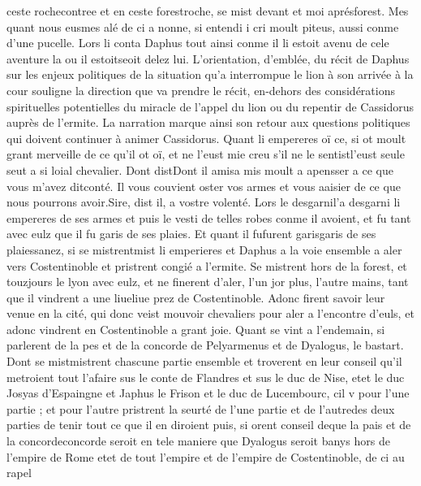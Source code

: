 \documentclass{article}
\begin{document}
\begin{pages}
      ceste 
         rochecontree et en ceste forestroche, se mist devant et 
            moi aprésforest. Mes quant nous eusmes alé de ci a nonne, 
      si entendi i cri moult piteus, aussi conme d’une pucelle.
   Lors li conta Daphus tout ainsi conme il li estoit avenu 
      de cele aventure la ou il estoitseoit delez lui.
L'orientation, d'emblée, du récit de Daphus sur les enjeux politiques de la situation qu'a interrompue le lion
à son arrivée à la cour souligne la direction que va prendre le récit, en-dehors des considérations spirituelles potentielles 
du miracle de l'appel du lion ou du repentir de Cassidorus auprès de l'ermite. La narration marque ainsi son retour aux questions
politiques qui doivent continuer à animer Cassidorus. \pend
\pstart Quant li empereres oï ce, si ot moult grant merveille de ce qu’il ot
   oï, et ne l’eust mie creu s’il ne le sentistl'eust seule seut 
   a si loial chevalier.
   Dont distDont
      il
      amisa mis moult a apensser a ce que vous m’avez 
      ditconté. Il vous couvient oster vos armes 
      et vous aaisier de ce que nous pourrons avoir.Sire, dist il, a vostre volenté.
   Lors le desgarnil'a desgarni li empereres 
   de ses armes et puis le vesti de telles robes conme il avoient, et fu tant avec eulz que il fu garis de ses plaies. Et quant il 
   fufurent 
   garisgaris de ses plaiessanez, 
   si se mistrentmist li emperieres 
   et Daphus a la voie ensemble a aler vers 
   Costentinoble et pristrent congié a l’ermite. 
   Se mistrent hors de la forest, et touzjours 
   le lyon avec eulz, et ne finerent d’aler, l’un jor plus, l’autre mains, 
   tant que il vindrent a une liueliue prez de 
   Costentinoble. Adonc firent savoir leur venue en 
   la cité, qui donc veist mouvoir chevaliers pour aler a l’encontre d’euls, et 
   adonc vindrent en Costentinoble a grant joie. 
   Quant se vint a l’endemain, si parlerent de la pes et de la concorde de 
   Pelyarmenus et de Dyalogus, le bastart. \pend
\pstart Dont se mistmistrent chascune partie ensemble 
   et troverent en leur conseil qu’il metroient tout l’afaire sus 
   le conte de Flandres 
   et sus le duc de Nise, 
   etet le duc Josyas 
   d’Espaingne et Japhus le 
   Frison et 
   le duc de Lucembourc, cil v 
   pour l’une partie ; et pour l’autre pristrent la seurté 
   de l’une partie et de l’autredes deux parties de tenir tout ce que 
   il en diroient puis, si orent conseil deque la pais et 
   de la concordeconcorde seroit 
   en tele maniere que Dyalogus seroit banys hors de 
   l’empire de Rome 
   etet de tout l'empire et de l'empire 
   de Costentinoble, de ci au rapel 

\end{pages}
\end{document}
